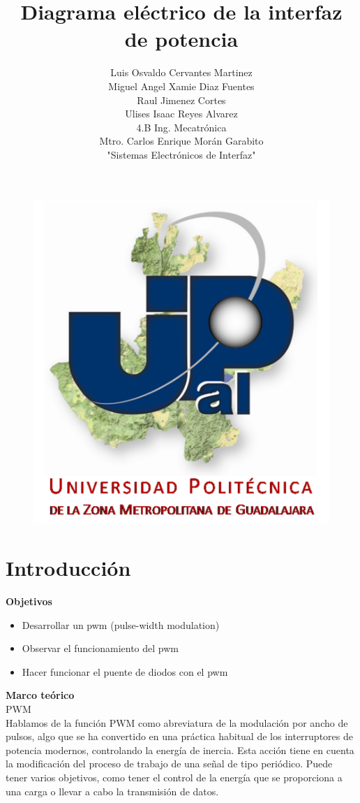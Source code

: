 \documentclass[10pt,a4paper]{article}
\author{Luis Osvaldo Cervantes Martinez\\Miguel Angel Xamie Diaz Fuentes\\Raul Jimenez Cortes\\Ulises Isaac Reyes Alvarez\\4.B Ing. Mecatrónica\\Mtro. Carlos Enrique Morán Garabito\\"Sistemas Electrónicos de Interfaz"}
\title{Diagrama eléctrico de la interfaz de potencia}
\begin{document}
\maketitle
\begin{figure}[hbtp]
\centering
\includegraphics[scale=2]{Pictures/UPZMG.png}
\end{figure}

\newpage
\section{Introducción}
\textbf{Objetivos}
\begin{itemize}
\item Desarrollar un pwm (pulse-width modulation)
\item Observar el funcionamiento del pwm
\item Hacer funcionar el puente de diodos con el pwm
\end{itemize}

\textbf{Marco teórico}\\
PWM \\
Hablamos de la función PWM como abreviatura de la modulación por ancho de pulsos, algo que se ha convertido en una práctica habitual de los interruptores de potencia modernos, controlando la energía de inercia. Esta acción tiene en cuenta la modificación del proceso de trabajo de una señal de tipo periódico. Puede tener varios objetivos, como tener el control de la energía que se proporciona a una carga o llevar a cabo la transmisión de datos.\\
\end{document}
